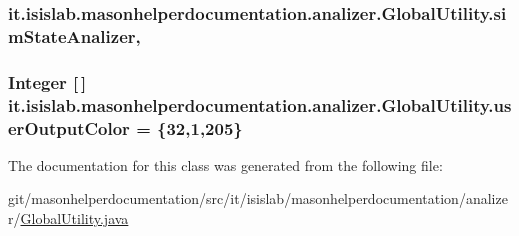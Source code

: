 \hypertarget{classit_1_1isislab_1_1masonhelperdocumentation_1_1analizer_1_1_global_utility_a4ed7ab5249d920545c5081d813ef1029}{
\subsubsection[{sim\-State\-Analizer}]{ it.\-isislab.\-masonhelperdocumentation.\-analizer.\-Global\-Utility.\-sim\-State\-Analizer\hspace{0.3cm}{\ttfamily [static]}, {\ttfamily [private]}}}\label{classit_1_1isislab_1_1masonhelperdocumentation_1_1analizer_1_1_global_utility_a4ed7ab5249d920545c5081d813ef1029}
\hypertarget{classit_1_1isislab_1_1masonhelperdocumentation_1_1analizer_1_1_global_utility_aec864cd710b27ece609c5a6093211ff4}{
\subsubsection[{user\-Output\-Color}]{\setlength{\rightskip}{0pt plus 5cm}Integer \mbox{[}$\,$\mbox{]} it.\-isislab.\-masonhelperdocumentation.\-analizer.\-Global\-Utility.\-user\-Output\-Color = \{32,1,205\}\hspace{0.3cm}{\ttfamily [static]}}}\label{classit_1_1isislab_1_1masonhelperdocumentation_1_1analizer_1_1_global_utility_aec864cd710b27ece609c5a6093211ff4}


The documentation for this class was generated from the following file\-:\begin{DoxyCompactItemize}
\item 
git/masonhelperdocumentation/src/it/isislab/masonhelperdocumentation/analizer/\hyperlink{_global_utility_8java}{Global\-Utility.\-java}\end{DoxyCompactItemize}
